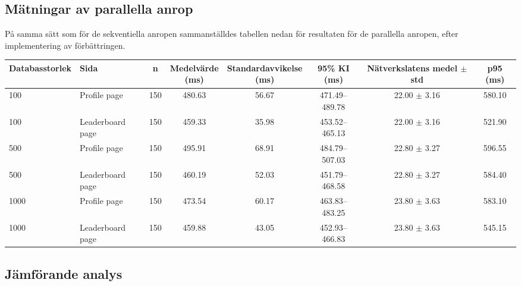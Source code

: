 \documentclass[letterpaper,twocolumn,10pt]{article}
\begin{document}
\subsection{Mätningar av parallella anrop}

\noindent
\begin{minipage}[t]{\columnwidth}
På samma sätt som för de sekventiella anropen sammanställdes tabellen nedan för
resultaten för de parallella anropen, efter implementering av förbättringen.
\end{minipage}

\begin{strip}
  \centering
  \footnotesize
  \setlength{\tabcolsep}{4pt}
    \begin{tabular}{@{}l l c c c c c c@{}}
        \toprule
          Databasstorlek & Sida & n & \shortstack{Medelvärde\\(ms)} &
          \shortstack{Standardavvikelse\\(ms)} & \shortstack{95\% KI\\(ms)} &
          \shortstack{Nätverkslatens\\medel $\pm$ std} & p95 (ms)    \\
        \midrule
            100         & Profile page & 150 & 480.63 & 56.67 &
            471.49--489.78 & 22.00 $\pm$ 3.16 & 580.10 \\
            100         & Leaderboard page  & 150 & 459.33 & 35.98 &
            453.52--465.13 & 22.00 $\pm$ 3.16 & 521.90 \\
            500         & Profile page & 150 & 495.91 & 68.91 &
            484.79--507.03 & 22.80 $\pm$ 3.27 & 596.55  \\
            500         & Leaderboard page  & 150 & 460.19 & 52.03 &
            451.79--468.58 & 22.80 $\pm$ 3.27 & 584.40 \\
            1000         & Profile page & 150 & 473.54 & 60.17 &
            463.83--483.25 & 23.80 $\pm$ 3.63 & 583.10 \\
            1000         & Leaderboard page  & 150 & 459.88 & 43.05 &
            452.93--466.83 & 23.80 $\pm$ 3.63 & 545.15 \\
        \bottomrule
    \end{tabular}
  \label{tab:parallel}
\end{strip}

\subsection{Jämförande analys}
\end{document}
